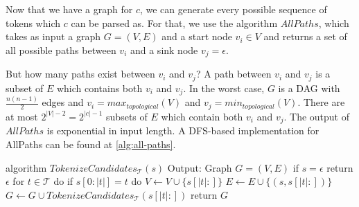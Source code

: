 Now that we have a graph for $c$, we can generate every possible sequence of tokens which $c$ can be parsed as.
For that, we use the algorithm $AllPaths$, which takes as input a graph $G = (V, E)$ and a start node $v_i \in V$ and returns a set of all possible paths between $v_i$ and a sink node $v_j = \epsilon$.

But how many paths exist between $v_i$ and $v_j$? A path between $v_i$ and $v_j$ is a subset of $E$ which contains both $v_i$ and $v_j$.
In the worst case, $G$ is a DAG with $\frac{n(n-1)}{2}$ edges and $v_i = max_{topological}(V)$ and $v_j = min_{topological}(V)$.
There are at most $2^{|V|-2} = 2^{|c|-1}$ subsets of $E$ which contain both $v_i$ and $v_j$.
The output of $AllPaths$ is exponential in input length.
A DFS-based implementation for AllPaths can be found at \autoref{alg:all-paths}.

\begin{Pseudocode}[float,caption={
TokenizeCandidates Algorithm.
This constructs a graph $G = (V, E)$ from a string. The resulting graph has up to $|s|$ nodes.
It also has up to $\frac{n(n-1)}{2}$ edges because $G$ is a DAG.
Dynamic Programming can be used to increase the algorithm's performance.
}, label={alg:tokenize-candidates}]
algorithm $TokenizeCandidates_{\mathcal{T}}(s)$
	Output: Graph $G = (V, E)$
	if $s = \epsilon$
		return $\epsilon$
	for $t \in \mathcal{T}$ do
		if $s[0{:}|t|] = t$ do
			$V \leftarrow V \cup \{ s[|t|{:}] \}$
			$E \leftarrow E \cup \{ (s, s[|t|{:}]) \}$
			$G \leftarrow G \cup TokenizeCandidates_{\mathcal{T}}(s[|t|{:}])$
	return $G$
\end{Pseudocode}

